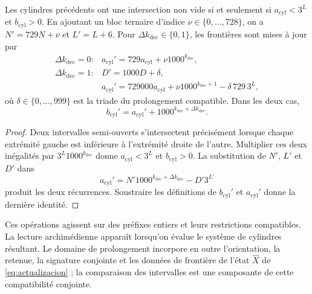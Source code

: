 \begin{lemma}
\label{memprof:cilindros}
Les cylindres précédents ont une intersection non vide si et seulement si
\(a_{\mathrm{cyl}}<3^L\) et \(b_{\mathrm{cyl}}>0\).
En ajoutant un bloc ternaire d'indice
\(\nu\in\{0,\ldots,728\}\), on a \(N'=729N+\nu\) et
\(L'=L+6\). Pour \(\Delta k_{\mathrm{dec}}\in\{0,1\}\),
les frontières sont mises à jour par
\[
 \begin{array}{ll}
 \Delta k_{\mathrm{dec}}=0:
   &a_{\mathrm{cyl}}'=729a_{\mathrm{cyl}}+\nu1000^{k_{\mathrm{dec}}},\\[2pt]
 \Delta k_{\mathrm{dec}}=1:
   &D'=1000D+\delta,\\
   &a_{\mathrm{cyl}}'=729000a_{\mathrm{cyl}}
      +\nu1000^{k_{\mathrm{dec}}+1}-\delta\,729\,3^L ,
 \end{array}
\]
où \(\delta\in\{0,\ldots,999\}\) est la triade du prolongement
compatible. Dans les deux cas,
\[
 b_{\mathrm{cyl}}'=a_{\mathrm{cyl}}'
          +1000^{k_{\mathrm{dec}}+\Delta k_{\mathrm{dec}}}.
\]
\end{lemma}
\begin{proof}
Deux intervalles semi-ouverts s'intersectent précisément lorsque chaque extrémité gauche est inférieure à l'extrémité droite de l'autre. Multiplier ces deux inégalités par \(3^L1000^{k_{\mathrm{dec}}}\) donne \(a_{\mathrm{cyl}}<3^L\) et \(b_{\mathrm{cyl}}>0\). La substitution de \(N'\), \(L'\) et \(D'\) dans
\[
 a_{\mathrm{cyl}}'
 =N'1000^{k_{\mathrm{dec}}+\Delta k_{\mathrm{dec}}}-D'3^{L'}
\]
produit les deux récurrences. Soustraire les définitions de
\(b_{\mathrm{cyl}}'\) et \(a_{\mathrm{cyl}}'\) donne la dernière identité.
\end{proof}

Ces opérations agissent sur des préfixes entiers et leurs restrictions
compatibles. La lecture archimédienne apparaît lorsqu'on évalue le système de
cylindres résultant. Le domaine de prolongement incorpore en outre
l'orientation, la retenue, la signature conjointe et les données de frontière de l'état
\(\widehat X\) de \eqref{eq:actualizacion} ; la comparaison des intervalles
est une composante de cette compatibilité conjointe.

